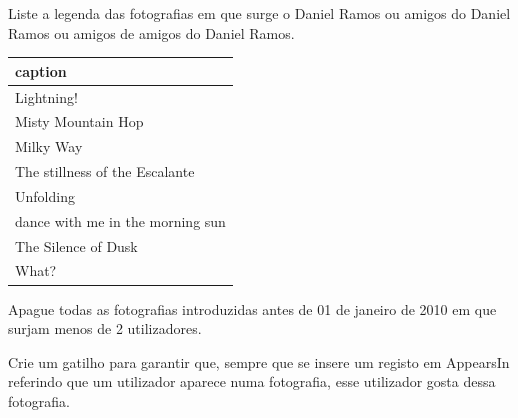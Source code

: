 \documentclass[type=normal, year=2014/15]{bdad_exam}
\begin{document}
{
Liste a legenda das fotografias em que surge o Daniel Ramos ou amigos do Daniel Ramos ou amigos de amigos do Daniel Ramos.
\begin{center} \begin{tabular}{l}
    \textbf{caption}                 \\ \hline
    Lightning!                       \\
    Misty Mountain Hop               \\
    Milky Way                        \\
    The stillness of the Escalante   \\
    Unfolding                        \\
    dance with me in the morning sun \\
    The Silence of Dusk              \\
    What?
\end{tabular} \end{center}


Apague todas as fotografias introduzidas antes de 01 de janeiro de 2010 em que surjam menos de 2 utilizadores.


Crie um gatilho para garantir que, sempre que se insere um registo em AppearsIn referindo que um utilizador aparece numa fotografia, esse utilizador gosta dessa fotografia.

}
\end{document}
